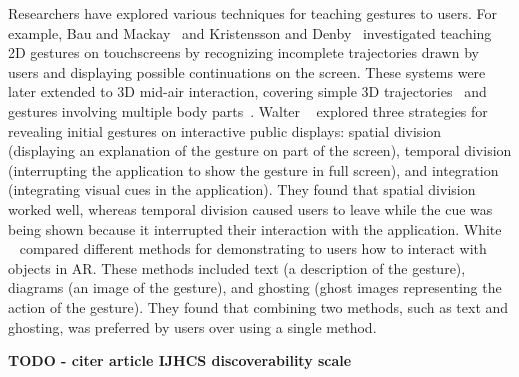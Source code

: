 Researchers have explored various techniques for teaching gestures to users.
%
For example, Bau and Mackay~\cite{Bau:2008} and Kristensson and Denby~\cite{Kristensson:2011} investigated teaching 2D gestures on touchscreens by recognizing incomplete trajectories drawn by users and displaying possible continuations on the screen.
%
These systems were later extended to 3D mid-air interaction, covering simple 3D trajectories~\cite{Fennedy:2021} and gestures involving multiple body parts~\cite{Rovelo:2015, Alt:2018}. 
%
Walter \etal~\cite{Walter:2013} explored three strategies for revealing initial gestures on interactive public displays: spatial division (\ie displaying an explanation of the gesture on part of the screen), temporal division (interrupting the application to show the gesture in full screen), and integration (integrating visual cues in the application). They found that spatial division worked well, whereas temporal division caused users to leave while the cue was being shown because it interrupted their interaction with the application.
%
White \etal~\cite{White:2007} compared different methods for demonstrating to users how to interact with objects in AR. These methods included text (\ie a description of the gesture), diagrams (\ie an image of the gesture), and ghosting (\ie ghost images representing the action of the gesture). They found that combining two methods, such as text and ghosting, was preferred by users over using a single method.
%

\textbf{TODO - citer article IJHCS discoverability scale}






